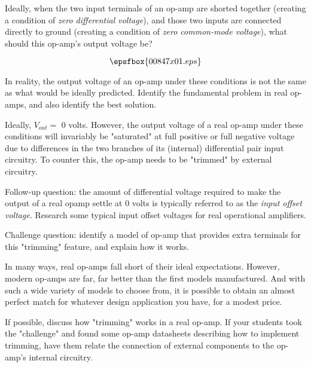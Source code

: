 

Ideally, when the two input terminals of an op-amp are shorted together (creating a condition of {\it zero differential voltage}), and those two inputs are connected directly to ground (creating a condition of {\it zero common-mode voltage}), what should this op-amp's output voltage be?

$$\epsfbox{00847x01.eps}$$

In reality, the output voltage of an op-amp under these conditions is not the same as what would be ideally predicted.  Identify the fundamental problem in real op-amps, and also identify the best solution.







Ideally, $V_{out} =$ 0 volts.  However, the output voltage of a real op-amp under these conditions will invariably be "saturated" at full positive or full negative voltage due to differences in the two branches of its (internal) differential pair input circuitry.  To counter this, the op-amp needs to be "trimmed" by external circuitry.

\vskip 10pt

Follow-up question: the amount of differential voltage required to make the output of a real opamp settle at 0 volts is typically referred to as the {\it input offset voltage}.  Research some typical input offset voltages for real operational amplifiers.

\vskip 10pt

Challenge question: identify a model of op-amp that provides extra terminals for this "trimming" feature, and explain how it works.







In many ways, real op-amps fall short of their ideal expectations.  However, modern op-amps are far, far better than the first models manufactured.  And with such a wide variety of models to choose from, it is possible to obtain an almost perfect match for whatever design application you have, for a modest price.

If possible, discuss how "trimming" works in a real op-amp.  If your students took the "challenge" and found some op-amp datasheets describing how to implement trimming, have them relate the connection of external components to the op-amp's internal circuitry.





